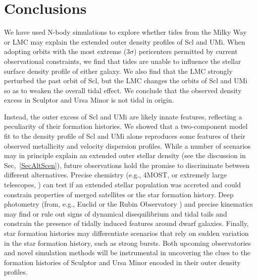 \documentclass[times,trackchanges, twocolumn, twocolappendix]{aastex701}
\begin{document}
\section{Conclusions } \label{SecConcl}

We have used N-body simulations to explore whether tides from the Milky Way or LMC may explain the extended outer density profiles  of Scl and UMi. When adopting orbits with the most extreme ($3\sigma$) pericenters permitted by current observational constraints, we find that tides are unable to influence the stellar surface density profile of either galaxy. We also find that the LMC strongly perturbed the past orbit of Scl, but the LMC changes the orbits of Scl and UMi so as to weaken the overall tidal effect. We conclude that the observed density excess in Sculptor and Ursa Minor is not tidal in origin. 

Instead, the outer excess of Scl and UMi are likely innate features, reflecting a peculiarity of their formation histories. We showed that a two-component model fit to the density profile of Scl and UMi alone reproduces some features of their observed metallicity and velocity dispersion profiles. While a number of scenarios may in principle explain an extended outer stellar density (see the discussion in Sec,~\ref{SecAltScen}), future
observations hold the promise to discriminate between different alternatives.  Precise chemistry (e.g., 4MOST, \citealt{skuladottir+2023} or extremely large telescopes, \citealt{jagourel+2018}) can test if an extended stellar population was accreted and could constrain properties of merged satellites or the star formation history. Deep photometry (from, e.g., Euclid \citealt{euclidcollaboration+2025} or the Rubin Observatory \citealt{ivezic+2019}) and precise kinematics may find or rule out signs of dynamical
disequilibrium and tidal tails and constrain the presence of tidally induced features around dwarf galaxies.
Finally, star formation histories may differentiate scenarios that rely on sudden variation in the star formation history, such as strong bursts. Both upcoming observatories and novel simulation methods will be instrumental in uncovering the clues to the formation histories of Sculptor and Ursa Minor encoded in their outer density profiles.
\end{document}

